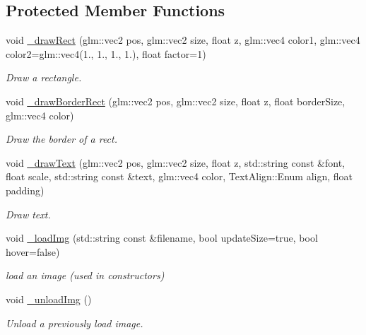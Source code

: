 \subsection*{Protected Member Functions}
\begin{DoxyCompactItemize}
\item 
void \hyperlink{class_a_base_u_i_a0bfffb8b6fc12a44ef7ac8ea63a8a866}{\+\_\+draw\+Rect} (glm\+::vec2 pos, glm\+::vec2 size, float z, glm\+::vec4 color1, glm\+::vec4 color2=glm\+::vec4(1., 1., 1., 1.), float factor=1)
\begin{DoxyCompactList}\small\item\em Draw a rectangle. \end{DoxyCompactList}\item 
void \hyperlink{class_a_base_u_i_a5941569c008d51d764db097198bba750}{\+\_\+draw\+Border\+Rect} (glm\+::vec2 pos, glm\+::vec2 size, float z, float border\+Size, glm\+::vec4 color)
\begin{DoxyCompactList}\small\item\em Draw the border of a rect. \end{DoxyCompactList}\item 
void \hyperlink{class_a_base_u_i_a9cf0a076fd9b8074cf8ffe6a30ec9f90}{\+\_\+draw\+Text} (glm\+::vec2 pos, glm\+::vec2 size, float z, std\+::string const \&font, float scale, std\+::string const \&text, glm\+::vec4 color, Text\+Align\+::\+Enum align, float padding)
\begin{DoxyCompactList}\small\item\em Draw text. \end{DoxyCompactList}\item 
void \hyperlink{class_a_base_u_i_a240a38aa0552dfa9ea7fcf8f056b3363}{\+\_\+load\+Img} (std\+::string const \&filename, bool update\+Size=true, bool hover=false)
\begin{DoxyCompactList}\small\item\em load an image (used in constructors) \end{DoxyCompactList}\item 
\mbox{\label{class_a_base_u_i_a4483f9f8c5f4f72a185d850ab94e90bb}} 
void \hyperlink{class_a_base_u_i_a4483f9f8c5f4f72a185d850ab94e90bb}{\+\_\+unload\+Img} ()
\begin{DoxyCompactList}\small\item\em Unload a previously load image. \end{DoxyCompactList}\item 

\end{DoxyCompactItemize}
